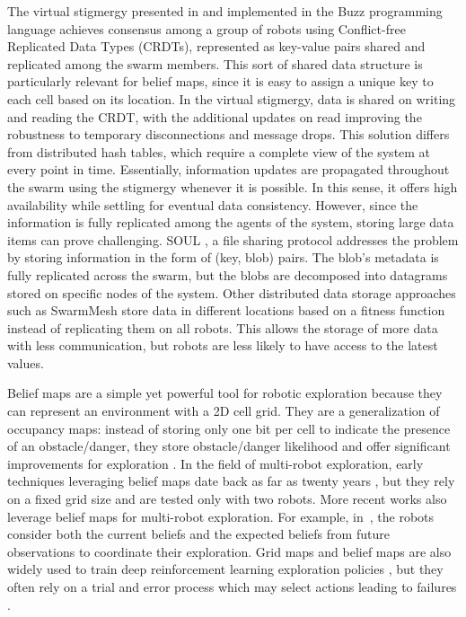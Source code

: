 The virtual stigmergy presented in \cite{pinciroliTuple2016} and implemented in the Buzz
programming language \cite{pinciroliBuzz2016} achieves consensus among
a group of robots using Conflict-free Replicated Data Types (CRDTs),
represented as key-value pairs shared and replicated among the swarm members. This sort of shared data structure is particularly relevant for belief maps, since it is easy to assign a unique key to each cell based on its location.  In the virtual stigmergy, data is shared on writing and reading the CRDT, with the
additional updates on read improving the robustness to temporary
disconnections and message drops. This solution differs from
distributed hash tables, which require a complete view of the system
at every point in time. Essentially, information updates are propagated throughout the swarm using the stigmergy whenever it is possible. In this sense, it offers high availability while settling for eventual data consistency. However, since the information is fully replicated among the agents of the system, storing large data items can prove challenging. SOUL \cite{varadharajan2020soul}, a file sharing protocol addresses the problem by storing information in the form of (key, blob) pairs. The blob’s metadata is fully replicated across the swarm, but the blobs are decomposed into datagrams stored on specific nodes of the system. Other distributed data storage approaches such as SwarmMesh \cite{majcherczykSwarmmesh2020} store data in different
locations based on a fitness function instead of replicating them on
all robots. This allows the storage of more data with less
communication, but robots are less likely to have access to the latest
values.

Belief maps are a simple yet powerful tool for robotic exploration
because they can represent an environment with a 2D cell grid. They
are a generalization of occupancy maps: instead of storing only one
bit per cell to indicate the presence of an obstacle/danger, they
store obstacle/danger likelihood and offer significant improvements
for exploration \cite{stachnissMappingExplorationMobile2003}. In the
field of multi-robot exploration, early techniques leveraging belief
maps date back as far as twenty years
\cite{kobayashiSharingExploringInformation2002,kobayashiDeterminationExplorationTarget2003},
but they rely on a fixed grid size and are tested only with two
robots. More recent works also leverage belief maps for multi-robot
exploration. For example,
in~\cite{indelmanCooperativeMultirobotBelief2018}, the robots consider
both the current beliefs and the expected beliefs from future
observations to coordinate their exploration. Grid maps and belief
maps are also widely used to train deep reinforcement learning
exploration policies
\cite{hanGridWiseControlMultiAgent,panovGridPathPlanning2018}, but they often rely on a trial and error process which may select actions leading to failures \cite{garciaSafeExplorationState2012,andersenSafeReinforcementlearningIndustrial2020}.


